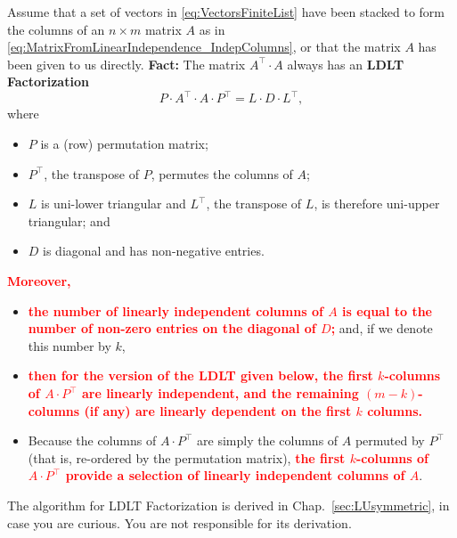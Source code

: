 \begin{tcolorbox}[sharp corners, colback=green!30, colframe=green!80!blue,
title=\textbf{ {\Large \textcolor{red}{\bf Uber} Pro-Tip:} \large Number of Linearly Independent Vectors via an Enhanced LU Factorization}]
Assume that a set of vectors in \eqref{eq:VectorsFiniteList} have been stacked to form the columns of an $n \times m$ matrix $A$ as in \eqref{eq:MatrixFromLinearIndependence_IndepColumns}, or that the matrix $A$ has been given to us directly. \textbf{Fact:} The matrix $A^\top \cdot A$ always has an \textbf{LDLT Factorization}
\begin{equation}
    \label{eq:LDLTfactorization}
    P\cdot A^\top \cdot A \cdot P^\top = L\cdot D \cdot L^\top,
\end{equation}
where
\begin{itemize}
    \item $P$ is a (row) permutation matrix;
    \item $P^\top$, the transpose of $P$, permutes the columns of $A$;
    \item $L$ is uni-lower triangular and $L^\top$, the transpose of $L$, is therefore uni-upper triangular; and
    \item $D$ is diagonal and has non-negative entries.
\end{itemize}
\textcolor{red}{\bf Moreover,}
\begin{itemize}
    \item \textcolor{red}{\bf the number of linearly independent columns of $A$ is equal to the number of non-zero entries on the diagonal of $D$;} and, if we denote this number by $k$,
    \item  \textcolor{red}{\bf then for the version of the LDLT given below, the first $k$-columns of $A \cdot P^\top$ are linearly independent, and the remaining $(m-k)$-columns (if any) are linearly dependent on the first $k$ columns.} 
    \item Because the columns of $A\cdot P^\top$ are simply the columns of $A$ permuted by $P^\top$ (that is, re-ordered by the permutation matrix), \textcolor{red}{\bf the first $k$-columns of $A \cdot P^\top$ provide a selection of linearly independent columns of $A$}.
\end{itemize}

\end{tcolorbox}
\vspace*{.2cm}

The algorithm for LDLT Factorization is derived in Chap.~\ref{sec:LUsymmetric}, in case you are curious. You are not responsible for its derivation.

